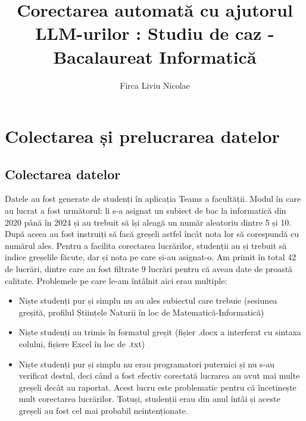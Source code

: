 \documentclass[12pt, a4paper]{report}
\title{Corectarea automată cu ajutorul LLM-urilor : Studiu de caz - Bacalaureat Informatică}
\author{Firca Liviu Nicolae}
\begin{document}
\cleardoublepage
\let\ps@plain


\restoregeometry
{}


\addtocounter{page}{1}



\tableofcontents

\cleardoublepage
\pagestyle{main}
\let\ps@plain\ps@main



\chapter{Colectarea și prelucrarea datelor}
\section{Colectarea datelor}
Datele au fost generate de studenți în aplicația Teams a facultății. Modul în care au lucrat a fost următorul: li s-a asignat un subiect de bac la informatică din 2020 până în 2024 și au trebuit să își aleagă un număr aleatoriu dintre 5 și 10. După aceea au fost instruiți să facă greșeli astfel încât nota lor să corespundă cu numărul ales.  
Pentru a facilita corectarea lucrărilor, studenții au și trebuit să indice greșelile făcute, dar și nota pe care și-au asignat-o.  
Am primit în total 42 de lucrări, dintre care au fost filtrate 9 lucrări pentru că aveau date de proastă calitate.  
Problemele pe care le-am întâlnit aici erau multiple:  
\begin{itemize}
  \item Niște studenți pur și simplu nu au ales subiectul care trebuie (sesiunea greșită, profilul Științele Naturii în loc de Matematică-Informatică)
  \item Niște studenți au trimis în formatul greșit (fișier .docx a interferat cu sintaxa colului, fișiere Excel în loc de .txt)
  \item Niște studenți pur și simplu nu erau programatori puternici și nu s-au verificat destul, deci când a fost efectiv corectată lucrarea au
  avut mai multe greșeli decât au raportat. Acest lucru este problematic pentru că încetinește mult corectarea lucrărilor. Totuși, studenții erau din anul întâi și aceste greșeli au fost cel mai probabil neintenționate.
\end{itemize}
\end{document}
